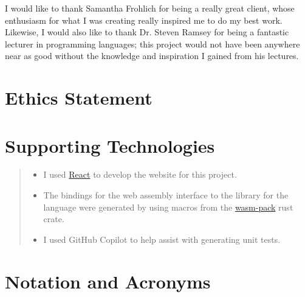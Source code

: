 I would like to thank Samantha Frohlich for being a really great client, whose enthusiasm for what I was creating really inspired me to do my best work. Likewise, I would also like to thank Dr. Steven Ramsey for being a fantastic lecturer in programming languages; this project would not have been anywhere near as good without the knowledge and inspiration I gained from his lectures. 

\makedecl
\makeaidecl
\tableofcontents
\listoffigures
\listoftables


\chapter*{Ethics Statement}


\chapter*{Supporting Technologies}
\label{chap:supporting_tech}

\begin{quote}
\noindent
\begin{itemize}
\item I used \href{https://react.dev/}{React} to develop the website for this project.
\item The bindings for the web assembly interface to the library for the language were generated by using macros from the \href{https://github.com/rustwasm/wasm-pack}{wasm-pack} rust crate.
\item I used GitHub Copilot to help assist with generating unit tests.
\end{itemize}
\end{quote}


\chapter*{Notation and Acronyms}
\begin{acronym}
\end{acronym}